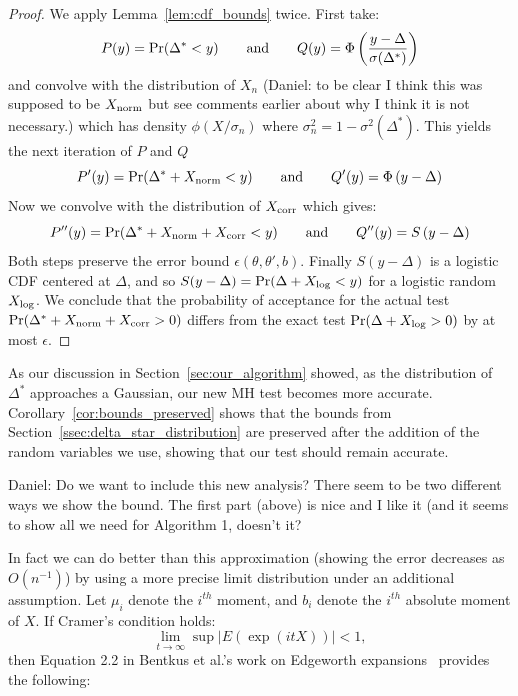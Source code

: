\documentclass{article}
\begin{document}
\begin{proof}
We apply Lemma~\ref{lem:cdf_bounds} twice. First take:
\begin{equation}
    P(y) = {\rm Pr}(\Delta^* < y) \qquad {\rm and}\qquad Q(y) = \Phi\left(\frac{y-\Delta}{\sigma(\Delta^*)}\right)
\end{equation}
and convolve with the distribution of $X_n$ {\color{blue} (Daniel: to be clear I
think this was supposed to be $X_{\rm norm}$ but see comments earlier about why
I think it is not necessary.)} which has density $\phi(X/\sigma_n)$ where
$\sigma_n^2 = 1 - \sigma^2(\Delta^*)$. This yields the next iteration of $P$ and
$Q$
\begin{equation}
    P'(y) = {\rm Pr}(\Delta^*+X_{\rm norm} < y) \qquad {\rm and}\qquad Q'(y) = \Phi\left({y-\Delta}\right)
\end{equation}
Now we convolve with the distribution of $X_{\rm corr}$ which gives:
\begin{equation}
    P''(y) = {\rm Pr}(\Delta^*+X_{\rm norm}+X_{\rm corr} < y) \qquad {\rm and}\qquad Q''(y) = S\left({y-\Delta}\right)
\end{equation}
Both steps preserve the error bound $\epsilon(\theta,\theta',b)$. Finally
$S(y-\Delta)$ is a logistic CDF centered at $\Delta$, and so $S(y-\Delta) = {\rm
Pr}(\Delta + X_{\rm log} < y)$ for a logistic random $X_{\rm log}$. We conclude
that the probability of acceptance for the actual test ${\rm Pr}(\Delta^*+X_{\rm
norm}+X_{\rm corr} > 0)$ differs from the exact test ${\rm Pr}(\Delta+X_{\rm
log} > 0)$ by at most $\epsilon$.
\end{proof}

As our discussion in Section~\ref{sec:our_algorithm} showed, as the distribution
of $\Delta^*$ approaches a Gaussian, our new MH test becomes more accurate.
Corollary~\ref{cor:bounds_preserved} shows that the bounds from
Section~\ref{ssec:delta_star_distribution} are preserved after the addition of
the random variables we use, showing that our test should remain accurate.

{\color{blue} Daniel: Do we want to include this new analysis? There seem to be
two different ways we show the bound. The first part (above) is nice and I like
it (and it seems to show all we need for Algorithm 1, doesn't it?}

In fact we can do better than this approximation (showing the error decreases as
$O(n^{-1})$) by using a more precise limit distribution under an additional
assumption. Let $\mu_i$ denote the $i^{th}$ moment, and $b_i$ denote the
$i^{th}$ absolute moment of $X$. If Cramer's condition holds:
\begin{equation}\label{eq:cramers_condition}
    \lim_{t \to \infty} \sup |E(\exp(i t X))| < 1,
\end{equation}
then Equation 2.2 in Bentkus et al.'s work on Edgeworth
expansions~\cite{Bentkus97} provides the following:
\end{document}

